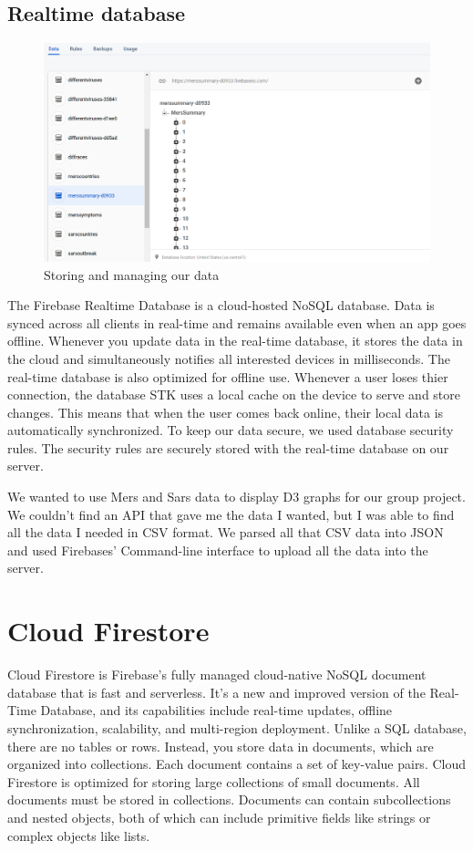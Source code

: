 \subsection{Realtime database}

\begin{figure}
    \centering
    \includegraphics[scale=0.4]{img/Firebasedb.PNG}
    \caption{Storing and managing our data}
    \label{fig:my_label4}
\end{figure}


The Firebase Realtime Database is a cloud-hosted NoSQL database.
Data is synced across all clients in real-time and remains available even when an app goes offline.
Whenever you update data in the real-time database, it stores the data in the cloud and simultaneously notifies all interested devices in milliseconds. The real-time database is also optimized for offline use.
Whenever a user loses thier connection, the database STK uses a local cache on the device to serve and store changes. This means that when the user comes back online, their local data is automatically synchronized. To keep our data secure, we used database security rules.
The security rules are securely stored with the real-time database on our server.

We wanted to use Mers and Sars data to display D3 graphs for our group project.
We couldn’t find an API that gave me the data I wanted, but I was able to find all the data I needed in CSV format. 
We parsed all that CSV data into JSON and used Firebases’ Command-line interface to upload all the data into the server.


\section{Cloud Firestore}
Cloud Firestore is Firebase's fully managed cloud-native NoSQL document database that is fast and serverless. It's a new and improved version of the Real-Time Database, and its capabilities include real-time updates, offline synchronization, scalability, and multi-region deployment. Unlike a SQL database, there are no tables or rows. Instead, you store data in documents, which are organized into collections. Each document contains a set of key-value pairs.
Cloud Firestore is optimized for storing large collections of small documents.
All documents must be stored in collections. Documents can contain subcollections and nested objects, both of which can include primitive fields like strings or complex objects like lists.


